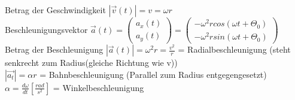\documentclass[8pt]{article}
\begin{document}
Betrag der Geschwindigkeit $|\overrightarrow{v}(t)|=v=\omega r$\\
Beschleunigungsvektor $\vec{a}(t)=\left(\begin{array}{c} a_x(t) \\ a_y(t) \end{array}\right) = \left(\begin{array}{c} -\omega^2 r cos(\omega t + \Theta_0)\\ -\omega^2 r sin(\omega t + \Theta_0) \end{array}\right)$ \\
Betrag der Beschleunigung $|\overrightarrow{a}(t)| = \omega^2 r = \frac{v^2}{r}$ = Radialbeschleunigung (steht senkrecht zum Radius(gleiche Richtung wie v))\\
$|\overrightarrow{a_t}| = \alpha r$ = Bahnbeschleunigung (Parallel zum Radius entgegengesetzt)\\
$\alpha = \frac{d\omega}{dt} [\frac{rad}{s^2}]$ = Winkelbeschleunigung \\ \\
\end{document}
